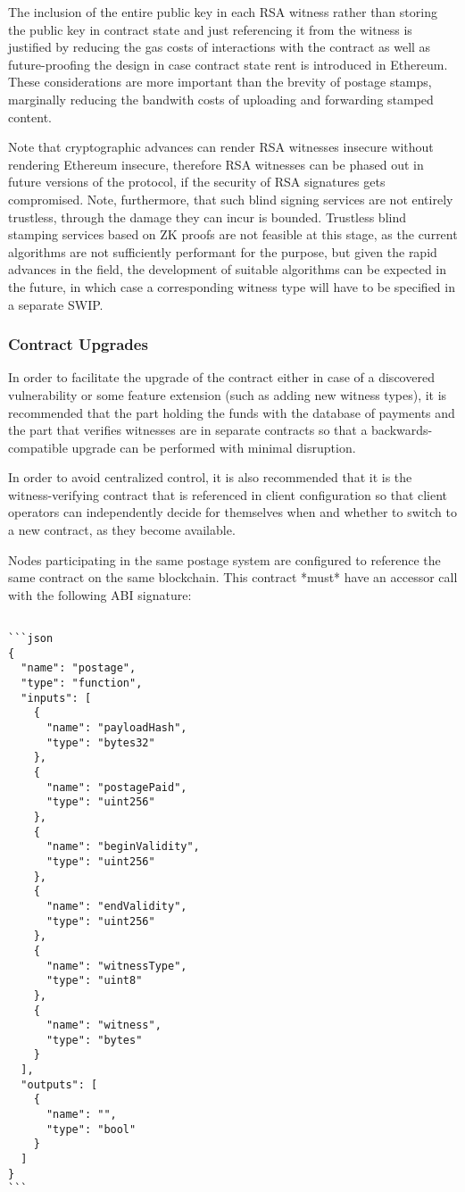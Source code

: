 The inclusion of the entire public key in each RSA witness rather than storing the public key in contract state and just referencing it from the witness is justified by reducing the gas costs of interactions with the contract as well as future-proofing the design in case contract state rent is introduced in Ethereum. These considerations are more important than the brevity of postage stamps, marginally reducing the bandwith costs of uploading and forwarding stamped content.

Note that cryptographic advances can render RSA witnesses insecure without rendering Ethereum insecure, therefore RSA witnesses can be phased out in future versions of the protocol, if the security of RSA signatures gets compromised. Note, furthermore, that such blind signing services are not entirely trustless, through the damage they can incur is bounded. Trustless blind stamping services based on ZK proofs are not feasible at this stage, as the current algorithms are not sufficiently performant for the purpose, but given the rapid advances in the field, the development of suitable algorithms can be expected in the future, in which case a corresponding witness type will have to be specified in a separate SWIP.

\subsubsection{Contract Upgrades}

In order to facilitate the upgrade of the contract either in case of a discovered vulnerability or some feature extension (such as adding new witness types), it is recommended that the part holding the funds with the database of payments and the part that verifies witnesses are in separate contracts so that a backwards-compatible upgrade can be performed with minimal disruption.

In order to avoid centralized control, it is also recommended that it is the witness-verifying contract that is referenced in client configuration so that client operators can independently decide for themselves when and whether to switch to a new contract, as they become available.


Nodes participating in the same postage system are configured to reference the same contract on the same blockchain. This contract
*must* have an accessor call with the following ABI signature:

\begin{lstlisting}

```json
{
  "name": "postage",
  "type": "function",
  "inputs": [
    {
      "name": "payloadHash",
      "type": "bytes32"
    },
    {
      "name": "postagePaid",
      "type": "uint256"
    },
    {
      "name": "beginValidity",
      "type": "uint256"
    },
    {
      "name": "endValidity",
      "type": "uint256"
    },
    {
      "name": "witnessType",
      "type": "uint8"
    },
    {
      "name": "witness",
      "type": "bytes"
    }
  ],
  "outputs": [
    {
      "name": "",
      "type": "bool"
    }
  ]
}
```

\end{lstlisting}

